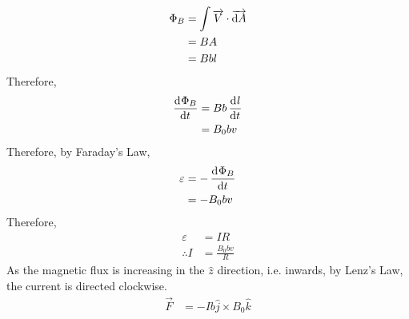 \documentclass[fleqn, a4paper, 12pt, twoside]{article}
\theoremstyle{definition}
\theoremstyle{theorem}
\begin{document}
\begin{solution}
	\begin{figure}[H]
	\end{figure}
		\begin{align*}
			\Phi_B & = \int \overrightarrow{V} \cdot \overrightarrow{\dif A} \\
                               & = B A                                                   \\
                               & = B b l
		\end{align*}
		Therefore,
		\begin{align*}
			\dod{\Phi_B}{t} & = B b \dod{l}{t} \\
                                        & = B_0 b v
		\end{align*}
		Therefore, by Faraday's Law,
		\begin{align*}
			\varepsilon & = -\dod{\Phi_B}{t} \\
                                    & = -B_0 b v
		\end{align*}
		Therefore,
		\begin{align*}
			\varepsilon  & = I R \\
			\therefore I & = \frac{B_0 b v}{R}
		\end{align*}
		As the magnetic flux is increasing in the $\hat{z}$ direction, i.e. inwards, by Lenz's Law, the current is directed clockwise.
		\begin{align*}
			\overrightarrow{F}                                & = -I b \hat{j} \times B_0 \hat{k}              \\

\end{align*}
\end{solution}
\end{document}
